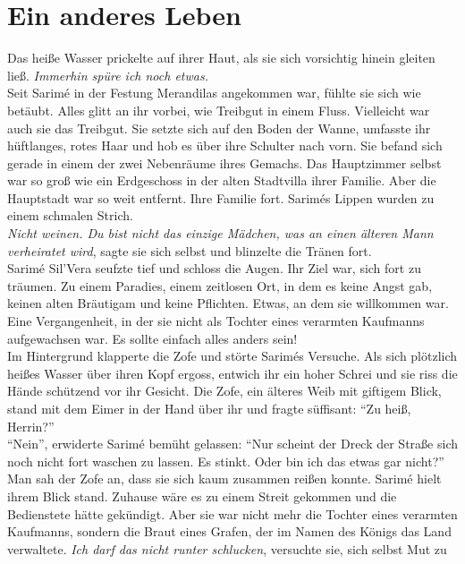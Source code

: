 \chapter{Ein anderes Leben}


Das heiße Wasser prickelte auf ihrer Haut, als sie sich vorsichtig hinein gleiten ließ. 
\textit{Immerhin spüre ich noch etwas.}\\
Seit Sarimé in der Festung Merandilas angekommen war, fühlte sie sich wie betäubt. Alles glitt an 
ihr vorbei, wie Treibgut in einem Fluss. Vielleicht war auch sie das Treibgut.  Sie setzte sich auf 
den Boden der Wanne, umfasste ihr hüftlanges, rotes Haar und hob es über ihre Schulter nach vorn. 
Sie befand sich gerade in einem der zwei Nebenräume ihres Gemachs. Das Hauptzimmer selbst war so 
groß wie ein Erdgeschoss in der alten Stadtvilla ihrer Familie. Aber die Hauptstadt war so 
weit entfernt. Ihre Familie fort. Sarimés Lippen wurden zu einem schmalen Strich.\\
\textit{Nicht weinen. Du bist nicht das einzige Mädchen, was an einen älteren Mann verheiratet 
wird}, sagte sie sich selbst und blinzelte die Tränen fort.\\
Sarimé Sil'Vera seufzte tief und schloss die Augen. Ihr Ziel war, sich fort zu träumen. Zu einem 
Paradies, einem zeitlosen Ort, in dem es keine Angst gab, keinen alten Bräutigam und keine 
Pflichten. Etwas, an dem sie willkommen war. Eine Vergangenheit, in der sie nicht als Tochter 
eines verarmten Kaufmanns aufgewachsen war. Es sollte einfach alles anders sein!\\
Im Hintergrund klapperte die Zofe und störte Sarimés Versuche. Als sich plötzlich heißes Wasser über 
ihren Kopf ergoss, entwich ihr ein hoher Schrei und sie riss die Hände schützend vor ihr Gesicht. 
Die Zofe, ein älteres Weib mit giftigem Blick, stand mit dem Eimer in der Hand über ihr und fragte 
süffisant: ``Zu heiß, Herrin?''\\
``Nein'', erwiderte Sarimé bemüht gelassen: ``Nur scheint der Dreck der Straße sich noch nicht fort 
waschen zu lassen. Es stinkt. Oder bin ich das etwas gar nicht?''\\
Man sah der Zofe an, dass sie sich kaum zusammen reißen konnte. Sarimé hielt ihrem Blick stand. 
Zuhause wäre es zu einem Streit gekommen und die Bedienstete hätte gekündigt. Aber sie war nicht 
mehr die Tochter eines verarmten Kaufmanns, sondern die Braut eines Grafen, der im Namen des Königs 
das Land verwaltete. \textit{Ich darf das nicht runter schlucken}, versuchte sie, sich selbst Mut zu 
